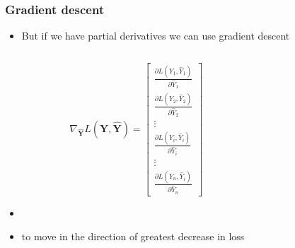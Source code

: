 \documentclass[xcolor={dvipsnames}]{beamer}
\begin{document}
\frame
{
 \frametitle{Gradient descent}

\begin{itemize}
\item<1-> But if we have partial derivatives we can use gradient descent

\begin{columns}
\begin{column}{.4\textwidth}

$${\nabla}_{\hat {\boldsymbol Y}} L({\boldsymbol Y}, \hat {\boldsymbol Y}) = \left[\begin{array}{c}\frac{\partial L(Y_1, \hat Y_1)}{\partial \hat Y_1}\\
\frac{\partial L(Y_2, \hat Y_2)}{\partial \hat Y_2} \\
\vdots \\
\frac{\partial L(Y_i, \hat Y_i)}{\partial \hat Y_i} \\
\vdots \\
\frac{\partial L(Y_n, \hat Y_i)}{\partial \hat Y_n}\end{array}\right]$$

\end{column}
\begin{column}{.65\textwidth}

\end{column}
\end{columns}

\item[] 
\item[] to move in the direction of greatest decrease in loss  
\end{itemize}
}
\end{document}

